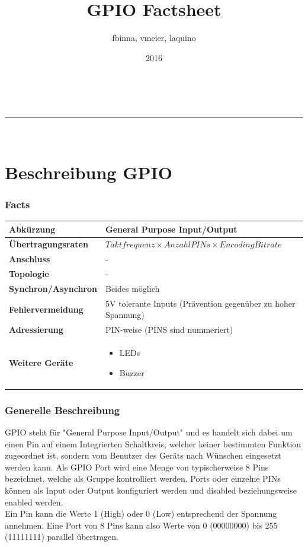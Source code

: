\documentclass[a4paper,11pt]{article}
\makeatletter
\newcommand{\linia}{\rule{\linewidth}{0.5pt}}
\renewcommand{\maketitle}{
\begin{center}
\vspace{2ex}
{\huge \textsc{\@title}}
\vspace{1ex}
\\
\linia\\
\@author \hfill \@date
\vspace{4ex}
\end{center}
}
\makeatother
\begin{document}
\title{GPIO Factsheet}

\author{fbinna, vmeier, laquino}

\date{2016}

\maketitle
\part{Beschreibung GPIO}
\section*{Facts}
\begin{tabular}{| p{3.5cm} | p{10cm} |}
	\hline
	\textbf{Abkürzung} & General Purpose Input/Output\\\hline
	\textbf{Übertragungsraten} & $Taktfrequenz \times Anzahl PINs \times Encoding Bitrate$ \\\hline
	\textbf{Anschluss} & -\\\hline
	\textbf{Topologie} & -\\\hline
	\textbf{Synchron/Asynchron} & Beides möglich\\\hline
	\textbf{Fehlervermeidung} & 5V tolerante Inputs (Prävention gegenüber zu hoher Spannung)\\\hline
	\textbf{Adressierung} & PIN-weise (PINS sind nummeriert)\\\hline
	\textbf{Weitere Geräte} & 
	\begin{itemize}
		\item LEDs
		\item Buzzer
	\end{itemize}
	\\\hline
\end{tabular}
\section*{Generelle Beschreibung}
GPIO steht für "General Purpose Input/Output" und es handelt sich dabei um einen Pin auf einem Integrierten Schaltkreis, welcher keiner bestimmten Funktion zugeordnet ist, sondern vom Benutzer des Geräts nach Wünschen eingesetzt werden kann. Als GPIO Port wird eine Menge von typischerweise 8 Pins bezeichnet, welche als Gruppe kontrolliert werden. Ports oder einzelne PINs können als Input oder Output konfiguriert werden und disabled beziehungsweise enabled werden. \\
Ein Pin kann die Werte 1 (High) oder 0 (Low) entsprechend der Spannung annehmen. Eine Port von 8 Pins kann also Werte von 0 (00000000) bis 255 (11111111) parallel übertragen.
	
\end{document}

